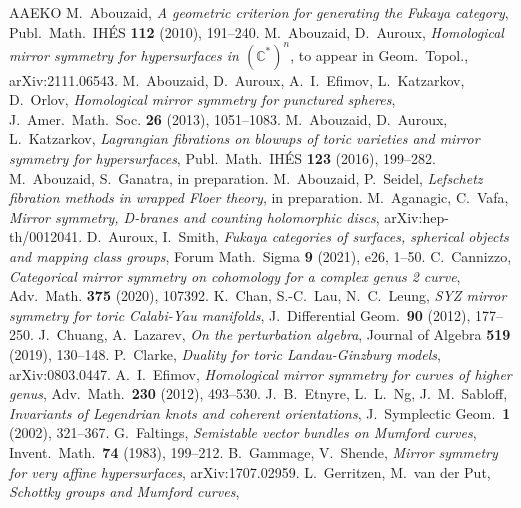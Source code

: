 \documentclass[11pt,leqno]{amsart}
\numberwithin{equation}{section}
\def\C{\mathbb{C}}
\begin{document}
\begin{thebibliography}{AAEKO}
   M.~Abouzaid, {\sl A geometric criterion for generating the Fukaya category}, 
   Publ.\ Math.\ IH\'ES {\bf 112} (2010), 191--240.
   M.~Abouzaid, D.~Auroux, 
   {\sl Homological mirror symmetry for hypersurfaces in $(\C^*)^n$}, 
   to appear in Geom.\ Topol., arXiv:2111.06543.
   M.~Abouzaid, D.~Auroux, A.~I.~Efimov, L.~Katzarkov, D.~Orlov,
   {\sl Homological mirror symmetry for punctured spheres}, 
   J.\ Amer.\ Math.\ Soc. {\bf 26} (2013), 1051--1083. %
   M.\ Abouzaid, D.\ Auroux, L.\ Katzarkov,
   {\sl Lagrangian fibrations on blowups of toric varieties and mirror symmetry
   for hypersurfaces},
   Publ.\ Math.\ IH\'ES {\bf 123} (2016), 199--282.
   M.~Abouzaid, S.~Ganatra, in preparation.
   M.~Abouzaid, P.~Seidel,
   {\sl Lefschetz fibration methods in wrapped Floer theory}, in preparation.
   M.\ Aganagic, C.\ Vafa,
   {\sl Mirror symmetry, D-branes and counting holomorphic discs},
   arXiv:hep-th/0012041.
   D.~Auroux, I.~Smith,
   {\sl Fukaya categories of surfaces, spherical objects and mapping class groups},
   Forum Math.\ Sigma {\bf 9} (2021), e26, 1--50.
   C.~Cannizzo,
   {\sl Categorical mirror symmetry on cohomology for a complex genus 2 curve},
   Adv.\ Math. {\bf 375} (2020), 107392.
   K.\ Chan, S.-C.\ Lau, N.\ C.\ Leung,
   {\sl SYZ mirror symmetry for toric Calabi-Yau manifolds},
   J.\ Differential Geom.\ {\bf 90} (2012), 177--250.
   J.~Chuang, A.~Lazarev, 
   {\sl On the perturbation algebra}, 
   Journal of Algebra {\bf 519} (2019), 130--148.
   P.\ Clarke,
   {\sl Duality for toric Landau-Ginzburg models},
   arXiv:0803.0447.
   A.~I.~Efimov, {\sl Homological mirror symmetry for curves of higher genus},
   Adv.\ Math.\ {\bf 230} (2012), 493--530.
   J.~B.~Etnyre, L.~L.~Ng, J.~M.~Sabloff,
   {\sl Invariants of Legendrian knots and coherent orientations},
   J.\ Symplectic Geom.\ {\bf 1} (2002), 321--367.
   G.~Faltings, 
   {\sl Semistable vector bundles on Mumford curves}, 
   Invent.\ Math.\ {\bf 74} (1983), 199--212.
   B.~Gammage, V.~Shende,
   {\sl Mirror symmetry for very affine hypersurfaces},
   arXiv:1707.02959.
   L.\ Gerritzen, M.\ van der Put,
   {\it Schottky groups and Mumford curves},

\end{thebibliography}
\end{document}
